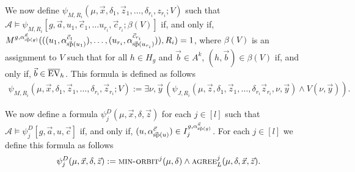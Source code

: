 \documentclass[../main/thesis.tex]{subfiles}
\begin{document}
We now define $\psi_{M, R_i} (\mu, \vec{x}, \delta_1, \vec{z}_1, \ldots,
\delta_{r_i}, {z}_{r_i}; V)$ such that $\mathcal{A} \models \psi_{M, R_i} [g,
\vec{a}, u_1, \vec{c}_1, \ldots u_{r_i}, \vec{c}_{r_i}; \beta(V)]$ if, and only
if, $M^{g, \alpha^{\vec{a}}_{\vec{\text{sp}}(g)}} (((u_1,
\alpha^{\vec{c}_1}_{\vec{\text{sp}}(u_1)}), \ldots, (u_{r_i},
\alpha^{\vec{c}_{r_i}}_{\vec{\text{sp}}(u_{r_i})})), R_i) = 1$, where $\beta(V)$ is
an assignment to $V$ such that for all $h \in H_g$ and $\vec{b} \in A^k$, $(h,
\vec{b}) \in \beta(V)$ if, and only if, $\vec{b} \in \overline{\text{EV}}_h$. This
formula is defined as follows
\begin{align*}
  \psi_{M, R_i}(\mu, \vec{x}, \delta_1, \vec{z}_1, \ldots,  \delta_{r_i}, \vec{z}_{r_i} ; V) := \exists \nu , \vec{y} \, (\psi_{J, R_i}(\mu, \vec{z},  \delta_1, \vec{z}_1, \ldots,  \delta_{r_i}\vec{z}_{r_i}, \nu, \vec{y}) \land V(\nu, \vec{y})).
\end{align*}

We now define a formula $\psi^{D}_j (\mu, \vec{x}, \delta, \vec{z})$ for each $j
\in [l]$ such that $\mathcal{A} \models \psi^{D}_j[g, \vec{a}, u, \vec{c}]$ if,
and only if, $(u, \alpha^{\vec{c}}_{\vec{\text{sp}}(u)}) \in I^{g,
  \alpha^{\vec{a}}_{\vec{\text{sp}}(g)}}_j$. For each $j \in [l]$ we define this
formula as follows
\begin{align*}
  \psi^{D}_j (\mu, \vec{x}, \delta, \vec{z}) := \textsc{min-orbit}^j (\mu, \delta) \land \textsc{agree}^j_L (\mu, \delta, \vec{x}, \vec{z}).
\end{align*}
\end{document}
